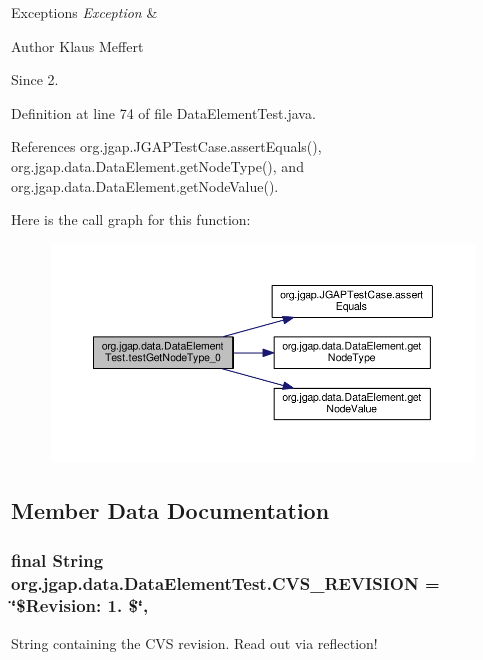 \begin{DoxyExceptions}{Exceptions}
{\em Exception} & \\
\hline
\end{DoxyExceptions}
\begin{DoxyAuthor}{Author}
Klaus Meffert 
\end{DoxyAuthor}
\begin{DoxySince}{Since}
2. 
\end{DoxySince}


Definition at line 74 of file Data\-Element\-Test.\-java.



References org.\-jgap.\-J\-G\-A\-P\-Test\-Case.\-assert\-Equals(), org.\-jgap.\-data.\-Data\-Element.\-get\-Node\-Type(), and org.\-jgap.\-data.\-Data\-Element.\-get\-Node\-Value().



Here is the call graph for this function\-:
\nopagebreak
\begin{figure}[H]
\begin{center}
\leavevmode
\includegraphics[width=350pt]{classorg_1_1jgap_1_1data_1_1_data_element_test_aa47569a52b666db2f5392f1e91ad06f2_cgraph}
\end{center}
\end{figure}




\subsection{Member Data Documentation}
\hypertarget{classorg_1_1jgap_1_1data_1_1_data_element_test_a1273c7f36f4364768756edeb78d0eaa8}{
\subsubsection[{C\-V\-S\-\_\-\-R\-E\-V\-I\-S\-I\-O\-N}]{\setlength{\rightskip}{0pt plus 5cm}final String org.\-jgap.\-data.\-Data\-Element\-Test.\-C\-V\-S\-\_\-\-R\-E\-V\-I\-S\-I\-O\-N = \char`\"{}\$Revision\-: 1. \$\char`\"{}\hspace{0.3cm}{\ttfamily [static]}, {\ttfamily [private]}}}\label{classorg_1_1jgap_1_1data_1_1_data_element_test_a1273c7f36f4364768756edeb78d0eaa8}
String containing the C\-V\-S revision. Read out via reflection! 


